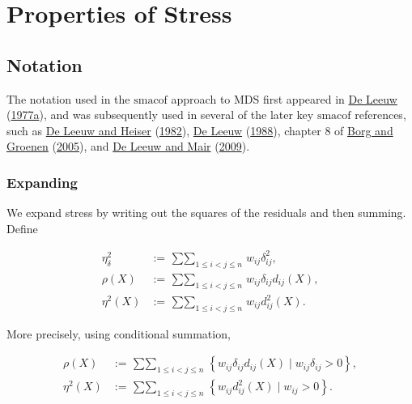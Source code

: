 \documentclass[
  12pt,
]{book}
\theoremstyle{definition}
\theoremstyle{definition}
\theoremstyle{definition}
\theoremstyle{definition}
\theoremstyle{remark}
\begin{document}
\hypertarget{propchapter}{%
\chapter{Properties of Stress}\label{propchapter}}

\hypertarget{propnotation}{%
\section{Notation}\label{propnotation}}

The notation used in the \(\textrm{smacof}\) approach to MDS first appeared in \protect\hyperlink{ref-deleeuw_C_77}{De Leeuw} (\protect\hyperlink{ref-deleeuw_C_77}{1977a}), and was subsequently used in several of the later key \(\textrm{smacof}\) references, such as \protect\hyperlink{ref-deleeuw_heiser_C_82}{De Leeuw and Heiser} (\protect\hyperlink{ref-deleeuw_heiser_C_82}{1982}), \protect\hyperlink{ref-deleeuw_A_88b}{De Leeuw} (\protect\hyperlink{ref-deleeuw_A_88b}{1988}), chapter 8 of \protect\hyperlink{ref-borg_groenen_05}{Borg and Groenen} (\protect\hyperlink{ref-borg_groenen_05}{2005}), and \protect\hyperlink{ref-deleeuw_mair_A_09c}{De Leeuw and Mair} (\protect\hyperlink{ref-deleeuw_mair_A_09c}{2009}).

\hypertarget{propexpand}{%
\subsection{Expanding}\label{propexpand}}

We expand stress by writing out the squares of the residuals and then summing. Define

\begin{align}
\eta_\delta^2&:=\mathop{\sum\sum}_{1\leq i<j\leq n}w_{ij}\delta_{ij}^2,\label{eq:comps1}\\
\rho(X)&:=\mathop{\sum\sum}_{1\leq i<j\leq n}w_{ij}\delta_{ij}d_{ij}(X),\label{eq:comps2}\\
\eta^2(X)&:=\mathop{\sum\sum}_{1\leq i<j\leq n}w_{ij}d_{ij}^2(X).\label{eq:comps3}
\end{align}

More precisely, using conditional summation,

\begin{align}
\rho(X)&:=\mathop{\sum\sum}_{1\leq i<j\leq n}\left\{w_{ij}\delta_{ij}d_{ij}(X)\mid w_{ij}\delta_{ij}>0\right\},\label{eq:compszero1}\\
\eta^2(X)&:=\mathop{\sum\sum}_{1\leq i<j\leq n}\left\{w_{ij}d_{ij}^2(X)\mid w_{ij}>0\right\}\label{eq:compszero2}.
\end{align}
\end{document}
